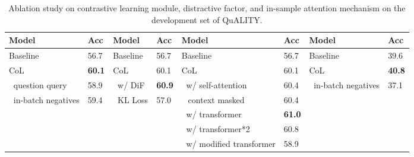 \begin{table}\scriptsize
    \centering
    \begin{tabular}{ll|ll|ll|ll}
    \hline
    {\bfseries Model} & {\bfseries Acc} & {\bfseries Model} & {\bfseries Acc} & {\bfseries Model} & {\bfseries Acc} & {\bfseries Model} & {\bfseries Acc} \\
    \hline
    Baseline & 56.7 & Baseline & 56.7 & Baseline & 56.7 & Baseline & 39.6 \\
    \hline
    CoL & {\bfseries 60.1} & CoL & 60.1 & CoL & 60.1 & CoL & {\bfseries 40.8} \\
    \hline
    $\ $ question query & 58.9 & $\ $ w/ DiF & {\bfseries 60.9} & $\ $ w/ self-attention & 60.4 & $\ $ in-batch negatives & 37.1 \\
    $\ $ in-batch negatives & 59.4 & $\ $ KL Loss & 57.0 & $\ \ $ context masked & 60.4 & \\
    & & & & $\ $ w/ transformer & {\bfseries 61.0} & & \\
    & & & & $\ $ w/ transformer*2 & 60.8 & & \\
    & & & & $\ $ w/ modified transformer & 58.9 & & \\
    \hline
    \end{tabular}
    \caption{\label{tab:4-3}
    Ablation study on contrastive learning module, distractive factor, and in-sample attention mechanism on the development set of QuALITY.
    }
\end{table}
